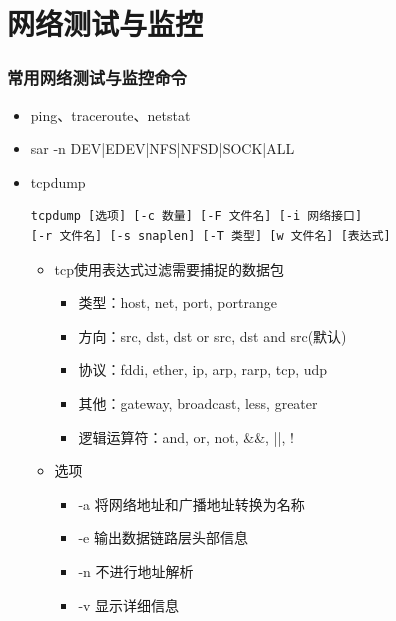 \documentclass[xcolor=svgnames,presentation]{beamer}
\begin{document}
\section{网络测试与监控}
\label{sec-2}
\begin{frame}[fragile]
\frametitle{常用网络测试与监控命令}
\label{sec-2-1}
\begin{itemize}

\item ping、traceroute、netstat
\label{sec-2-1-1}%

\item sar -n DEV|EDEV|NFS|NFSD|SOCK|ALL
\label{sec-2-1-2}%

\item tcpdump\\
\label{sec-2-1-3}%
\begin{verbatim}
tcpdump [选项] [-c 数量] [-F 文件名] [-i 网络接口] 
[-r 文件名] [-s snaplen] [-T 类型] [w 文件名] [表达式]
\end{verbatim}

\begin{itemize}

\item tcp使用表达式过滤需要捕捉的数据包
\label{sec-2-1-3-1}%
\begin{itemize}

\item 类型：host, net, port, portrange
\label{sec-2-1-3-1-1}%

\item 方向：src, dst, dst or src, dst and src(默认)
\label{sec-2-1-3-1-2}%

\item 协议：fddi, ether, ip, arp, rarp, tcp, udp
\label{sec-2-1-3-1-3}%

\item 其他：gateway, broadcast, less, greater
\label{sec-2-1-3-1-4}%

\item 逻辑运算符：and, or, not, \&\&, ||, !
\label{sec-2-1-3-1-5}%
\end{itemize} %

\item 选项
\label{sec-2-1-3-2}%
\begin{itemize}

\item -a 将网络地址和广播地址转换为名称
\label{sec-2-1-3-2-1}%

\item -e 输出数据链路层头部信息
\label{sec-2-1-3-2-2}%

\item -n 不进行地址解析
\label{sec-2-1-3-2-3}%

\item -v 显示详细信息
\label{sec-2-1-3-2-4}%
\end{itemize} %
\end{itemize} %
\end{itemize} %
\end{frame}
\end{document}
